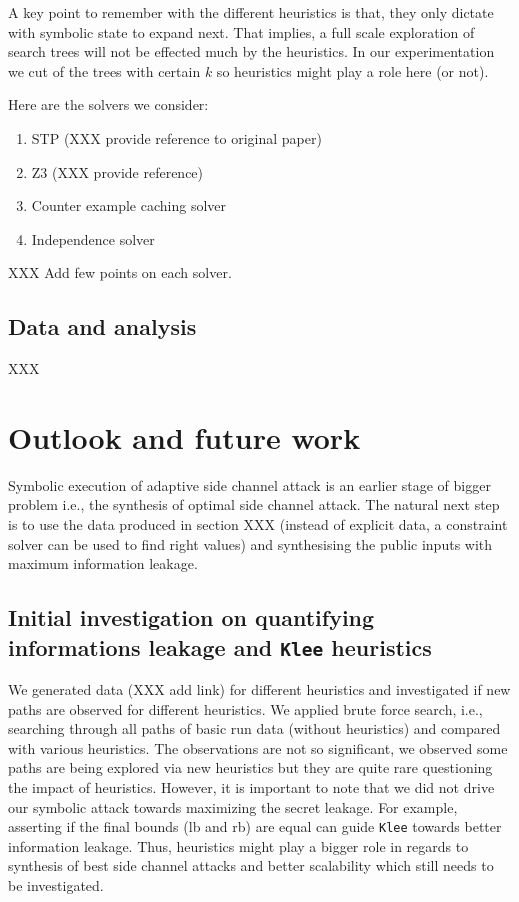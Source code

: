 \documentclass[11pt,a4paper,notitlepage]{article}
\begin{document}
A key point to remember with the different heuristics is that, they only dictate with symbolic state to expand next.
That implies, a full scale exploration of search trees will not be effected much by the heuristics.
In our experimentation we cut of the trees with certain $k$ so heuristics might play a role here (or not).

Here are the solvers we consider:
\begin{enumerate}
\item STP (XXX provide reference to original paper)
\item Z3 (XXX provide reference)
\item Counter example  caching solver
\item Independence solver
\end{enumerate}

XXX Add few points on each solver.

\subsection{Data and analysis}
\label{subsec:dataandanalysis}

XXX

\newpage

\section{Outlook and future work}
\label{sec:futurework}

Symbolic execution of adaptive side channel attack is an earlier stage of bigger problem i.e., the synthesis of optimal side channel attack.
The natural next step is to use the data produced in section XXX (instead of explicit data, a constraint solver can be used to find right values) and synthesising the public inputs with maximum information leakage.

\subsection{Initial investigation on quantifying informations leakage and \texttt{Klee} heuristics}
\label{subsec:initialinvestigationleakage}

We generated data (XXX add link) for different heuristics and investigated if new paths are observed for different heuristics.
We applied brute force search, i.e., searching through all paths of basic run data (without heuristics) and compared with various heuristics.
The observations are not so significant, we observed some paths are being explored via new heuristics but they are quite rare questioning the impact of heuristics.
However, it is important to note that we did not drive our symbolic attack towards maximizing the secret leakage.
For example, asserting if the final bounds (lb and rb) are equal can guide \texttt{Klee} towards better information leakage.
Thus, heuristics might play a bigger role in regards to synthesis of best side channel attacks and better scalability which still needs to be investigated.





\end{document}
